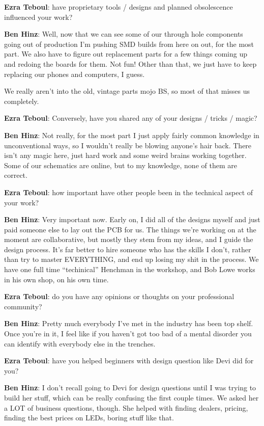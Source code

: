 \textbf{Ezra Teboul}: have proprietary tools / designs and planned obsolescence influenced your work? 

\textbf{Ben Hinz}: Well, now that we can see some of our through hole components going out of production I'm pushing SMD builds from here on out, for the most part. We also have to figure out replacement parts for a few things coming up and redoing the boards for them. Not fun! Other than that, we just have to keep replacing our phones and computers, I guess.  

We really aren’t into the old, vintage parts mojo BS, so most of that misses us completely.

\textbf{Ezra Teboul}: Conversely, have you shared any of your designs / tricks / magic? 

\textbf{Ben Hinz}: Not really, for the most part I just apply fairly common knowledge in unconventional ways, so I wouldn't really be blowing anyone's hair back. There isn’t any magic here, just hard work and some weird brains working together. Some of our schematics are online, but to my knowledge, none of them are correct. 

\textbf{Ezra Teboul}: how important have other people been in the technical aspect of your work? 

\textbf{Ben Hinz}: Very important now. Early on, I did all of the designs myself and just paid someone else to lay out the PCB for us. The things we're working on at the moment are collaborative, but mostly they stem from my ideas, and I guide the design process. It's far better to hire someone who has the skills I don't, rather than try to master EVERYTHING, and end up losing my shit in the process. We have one full time ``techinical'' Henchman in the workshop, and Bob Lowe works in his own shop, on his own time. 

\textbf{Ezra Teboul}: do you have any opinions or thoughts on your professional community? 

\textbf{Ben Hinz}: Pretty much everybody I've met in the industry has been top shelf. Once you're in it, I feel like if you haven't got too bad of a mental disorder you can identify with everybody else in the trenches. 

\textbf{Ezra Teboul}: have you helped beginners with design question like Devi did for you? 

\textbf{Ben Hinz}: I don't recall going to Devi for design questions until I was trying to build her stuff, which can be really confusing the first couple times. We asked her a LOT of business questions, though.  She helped with finding dealers, pricing, finding the best prices on LEDs, boring stuff like that. 


